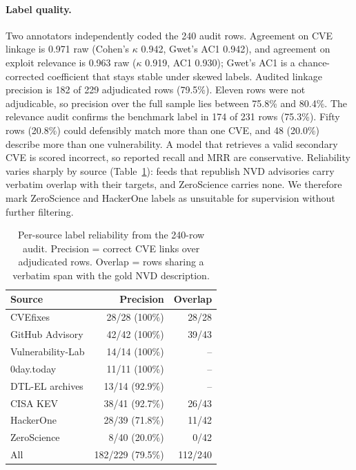 \documentclass{article}
\begin{document}
\paragraph{Label quality.} Two annotators independently coded the 240 audit rows. Agreement on CVE linkage is 0.971 raw (Cohen's $\kappa$ 0.942, Gwet's AC1 0.942), and agreement on exploit relevance is 0.963 raw ($\kappa$ 0.919, AC1 0.930); Gwet's AC1 is a chance-corrected coefficient that stays stable under skewed labels. Audited linkage precision is 182 of 229 adjudicated rows (79.5\%). Eleven rows were not adjudicable, so precision over the full sample lies between 75.8\% and 80.4\%. The relevance audit confirms the benchmark label in 174 of 231 rows (75.3\%). Fifty rows (20.8\%) could defensibly match more than one CVE, and 48 (20.0\%) describe more than one vulnerability. A model that retrieves a valid secondary CVE is scored incorrect, so reported recall and MRR are conservative. Reliability varies sharply by source (Table~\ref{tab:source-reliability}): feeds that republish NVD advisories carry verbatim overlap with their targets, and ZeroScience carries none. We therefore mark ZeroScience and HackerOne labels as unsuitable for supervision without further filtering.

\begin{table}[t]
\centering
\small
\caption{Per-source label reliability from the 240-row audit. Precision = correct CVE links over adjudicated rows. Overlap = rows sharing a verbatim span with the gold NVD description.}
\label{tab:source-reliability}
\begin{tabular}{lrr}
\toprule
\textbf{Source} & \textbf{Precision} & \textbf{Overlap} \\
\midrule
CVEfixes          & 28/28 (100\%)  & 28/28 \\
GitHub Advisory   & 42/42 (100\%)  & 39/43 \\
Vulnerability-Lab & 14/14 (100\%)  & -- \\
0day.today        & 11/11 (100\%)  & -- \\
DTL-EL archives   & 13/14 (92.9\%) & -- \\
CISA KEV          & 38/41 (92.7\%) & 26/43 \\
HackerOne         & 28/39 (71.8\%) & 11/42 \\
ZeroScience       & 8/40 (20.0\%)  & 0/42 \\
\midrule
All               & 182/229 (79.5\%) & 112/240 \\
\bottomrule
\end{tabular}
\end{table}
\end{document}
